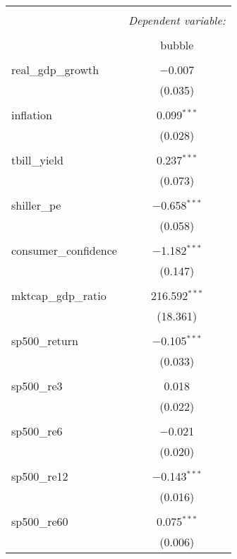 
\begin{table}[!htbp] \centering 
  \caption{} 
  \label{tab:logit} 
\begin{tabular}{@{\extracolsep{5pt}}lc} 
\\[-1.8ex]\hline 
\hline \\[-1.8ex] 
 & \multicolumn{1}{c}{\textit{Dependent variable:}} \\ 
\cline{2-2} 
\\[-1.8ex] & bubble \\ 
\hline \\[-1.8ex] 
 real\_gdp\_growth & $-$0.007 \\ 
  & (0.035) \\ 
  & \\ 
 inflation & 0.099$^{***}$ \\ 
  & (0.028) \\ 
  & \\ 
 tbill\_yield & 0.237$^{***}$ \\ 
  & (0.073) \\ 
  & \\ 
 shiller\_pe & $-$0.658$^{***}$ \\ 
  & (0.058) \\ 
  & \\ 
 consumer\_confidence & $-$1.182$^{***}$ \\ 
  & (0.147) \\ 
  & \\ 
 mktcap\_gdp\_ratio & 216.592$^{***}$ \\ 
  & (18.361) \\ 
  & \\ 
 sp500\_return & $-$0.105$^{***}$ \\ 
  & (0.033) \\ 
  & \\ 
 sp500\_re3 & 0.018 \\ 
  & (0.022) \\ 
  & \\ 
 sp500\_re6 & $-$0.021 \\ 
  & (0.020) \\ 
  & \\ 
 sp500\_re12 & $-$0.143$^{***}$ \\ 
  & (0.016) \\ 
  & \\ 
 sp500\_re60 & 0.075$^{***}$ \\ 
  & (0.006) \\ 

\end{tabular}
\end{table}

